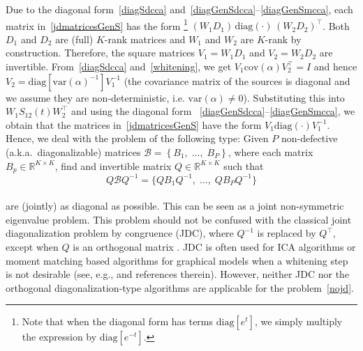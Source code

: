\documentclass{article}
\newcommand{\zero}{0}
\newcommand{\cbra}[1]{\left\{#1\right\}}
\newcommand{\diag}{\mathrm{diag}}
\newcommand{\R}{\mathbb{R}}
\newcommand{\var}{\mathrm{var}}
\newcommand{\cov}{\mathrm{cov}}
\newcommand{\bcal}{\mathcal{B}}
\begin{document}
Due to the diagonal form~\eqref{diagSdcca} and~\eqref{diagGenSdcca}--\eqref{diagGenSmcca}, each matrix in~\eqref{jdmatricesGenS} has the form%
\footnote{
Note that when the diagonal form has terms $\diag[e^t]$, we simply multiply the expression by $\diag[e^{-t}]$.
}
$(W_1D_1) \, \diag(\cdot) \, (W_2D_2)^{\top}$. Both $D_1$ and $D_2$ are (full) $K$-rank matrices and $W_1$ and $W_2$ are $K$-rank by construction. Therefore, the square matrices $V_1 = W_1D_1$ and $V_2 = W_2D_2$ are invertible. From~\eqref{diagSdcca} and~\eqref{whitening}, we get $V_1 \cov(\alpha) V_2^{\top} = I$ and hence $V_2 = \diag[{ \var(\alpha)^{-1} }]V_1^{-1}$ (the covariance matrix of the sources is diagonal and we assume they are non-deterministic, i.e. $\var(\alpha)\ne \zero$). Substituting this into $W_1 S_{12}(t) W_2^{\top}$ and using the diagonal form
~\eqref{diagGenSdcca}--\eqref{diagGenSmcca}, we obtain that the matrices in~\eqref{jdmatricesGenS} have the form $V_1 \diag(\cdot) V_1^{-1}$. Hence, we deal with the problem of the following type:
Given $P$ non-defective (a.k.a.~diagonalizable) matrices
$
\bcal = \cbra{ B_1,\;\dots,\; B_P}$,
where each matrix $B_p \in\R^{K\times K}$, find and invertible matrix $Q\in\R^{K\times K}$ such that 
\\[-.8em]
\begin{equation}\label{nojd}
Q \bcal Q^{-1} = \{ QB_1Q^{-1},\; \dots,\;QB_PQ^{-1} \}
\end{equation}
\\[-1.5em]
are (jointly) as diagonal as possible. This can be seen as a joint non-symmetric eigenvalue problem. 
This problem should not be confused with the classical joint diagonalization problem by congruence (JDC), where $Q^{-1}$ is replaced by $Q^{\top}$, except when $Q$ is an orthogonal matrix \citep{LucAlb2010}. JDC is often used for ICA algorithms or moment matching based algorithms for graphical models when a whitening step is not desirable (see, e.g., \citet{KulEtAl2015} and references therein). However, neither JDC nor the orthogonal diagonalization-type algorithms \citep[such as, e.g., the tensor power method by][]{AnaEtAl2014}  are applicable for the problem~\eqref{nojd}.
\end{document}
